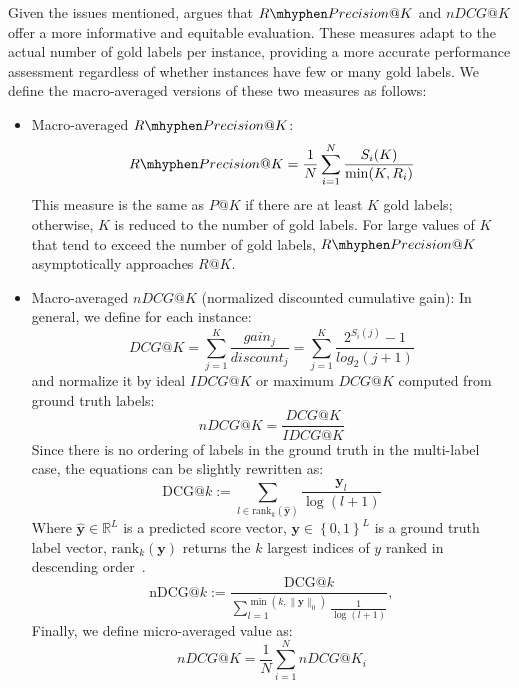 Given the issues mentioned, \textcite{chalkidis-etal-2019-large} argues that $R\mhyphen Precision@K$ and $nDCG@K$ offer a more informative and equitable evaluation. These measures adapt to the actual number of gold labels per instance, providing a more accurate performance assessment regardless of whether instances have few or many gold labels. We define the macro-averaged versions of these two measures as follows:
\begin{itemize}
    \item Macro-averaged $R\mhyphen Precision@K$:
        \begin{equation}
        R\mhyphen Precision@K = \frac{1}{N} \sum_{i=1}^N \frac{S_i(K)}{\min(K, R_i)}
        \end{equation}
    This measure is the same as $P@K$ if there are at least $K$ gold labels; otherwise, $K$ is reduced to the number of gold labels.
    For large values of $K$ that tend to exceed the number of gold labels, $R\mhyphen Precision@K$ asymptotically approaches $R@K$.
    \item Macro-averaged $nDCG@K$ (normalized discounted cumulative gain):
        In general, we define for each instance:
        \begin{equation}
        DCG@K = \sum_{j=1}^K \frac{gain_j}{discount_j} = \sum_{j=1}^K \frac{2^{S_i(j)} - 1}{log_2(j + 1)}
        \end{equation}
        and normalize it by ideal $IDCG@K$ or maximum $DCG@K$ computed from ground truth labels:
        \begin{equation}
        nDCG@K = \frac{DCG@K}{IDCG@K}
        \end{equation}
        Since there is no ordering of labels in the ground truth in the multi-label case, the equations can be slightly rewritten as:
        \begin{equation}
            \text{DCG}@k := \sum_{l\in {\text{rank}}_k (\hat{\mathbf y})} \frac{\mathbf y_l}{\log(l+1)}
        \end{equation}
        Where $\hat{\mathbf y} \in {\mathbb{R}}^{L}$ is a predicted score vector, $\mathbf y \in \left\lbrace 0, 1 \right\rbrace^L$ is a ground truth label vector, $\text{rank}_k(\mathbf y)$ returns the $k$ largest indices of $y$ ranked in descending order~\parencite{bhatia2016extremerepo}.
        \begin{equation}
            \text{nDCG}@k := \frac{{\text{DCG}}@k}{\sum_{l=1}^{\min(k, \|\mathbf y\|_0)} \frac{1}{\log(l+1)}},
        \end{equation}
        Finally, we define micro-averaged value as:
        \begin{equation}
        nDCG@K = \frac{1}{N} \sum_{i=1}^N nDCG@K_i
        \end{equation}
\end{itemize}

